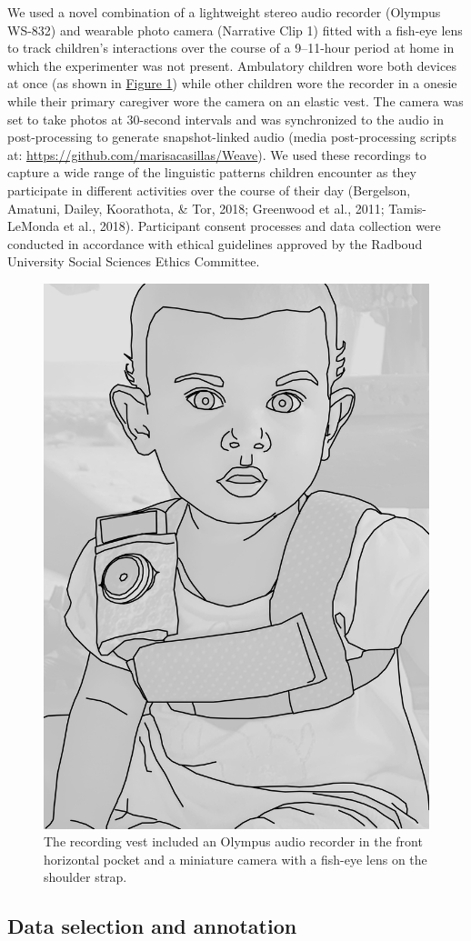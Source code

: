 \documentclass[,man,floatsintext]{apa6}
\begin{document}
We used a novel combination of a lightweight stereo audio recorder
(Olympus WS-832) and wearable photo camera (Narrative Clip 1) fitted
with a fish-eye lens to track children's interactions over the course of
a 9--11-hour period at home in which the experimenter was not present.
Ambulatory children wore both devices at once (as shown in
\protect\hyperlink{fig1}{Figure 1}) while other children wore the
recorder in a onesie while their primary caregiver wore the camera on an
elastic vest. The camera was set to take photos at 30-second intervals
and was synchronized to the audio in post-processing to generate
snapshot-linked audio (media post-processing scripts at:
\url{https://github.com/marisacasillas/Weave}). We used these recordings
to capture a wide range of the linguistic patterns children encounter as
they participate in different activities over the course of their day
(Bergelson, Amatuni, Dailey, Koorathota, \& Tor, 2018; Greenwood et al.,
2011; Tamis-LeMonda et al., 2018). Participant consent processes and
data collection were conducted in accordance with ethical guidelines
approved by the Radboud University Social Sciences Ethics Committee.

\begin{figure}

{\centering \includegraphics[width=0.3\linewidth]{Tseltal-CLE_files/TseltalCLE-RecordingVest} 

}

\caption{The recording vest included an Olympus audio recorder in the front horizontal pocket and a miniature camera with a fish-eye lens on the shoulder strap.}\label{fig:fig1}
\end{figure}

\subsection{Data selection and annotation}\label{methods-samples}
\end{document}
